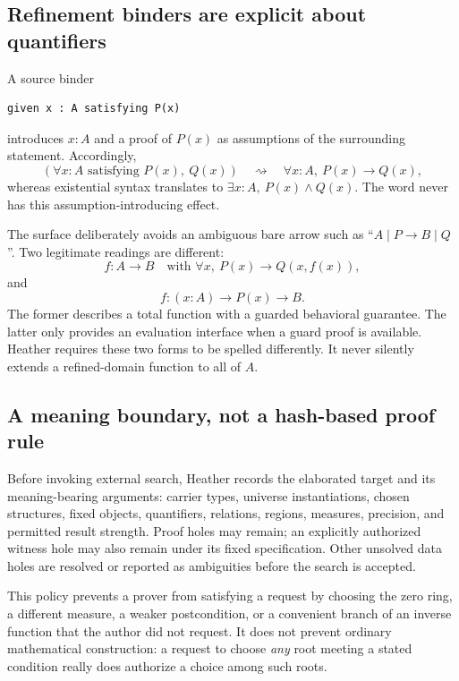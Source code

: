 \documentclass[11pt,letterpaper]{article}
\newcommand{\code}[1]{\texttt{\detokenize{#1}}}
\theoremstyle{definition}\newtheorem{definition}[theorem]{Definition}
\theoremstyle{remark}\newtheorem{remark}[theorem]{Remark}
\begin{document}
\subsection{Refinement binders are explicit about quantifiers}
A source binder
\par\noindent\begin{minipage}{\linewidth}
\begin{lstlisting}
given x : A satisfying P(x)
\end{lstlisting}
\end{minipage}\par
introduces $x:A$ and a proof of $P(x)$ as assumptions of the surrounding
statement. Accordingly,
\[
 (\forall x:A\text{ satisfying }P(x),\ Q(x))
 \quad\rightsquigarrow\quad \forall x:A,\ P(x)\to Q(x),
\]
whereas existential syntax translates to
$\exists x:A,\ P(x)\wedge Q(x)$. The word \code{establish} never has this
assumption-introducing effect.

The surface deliberately avoids an ambiguous bare arrow such as
``$A\mid P\to B\mid Q$''. Two legitimate readings are different:
\[
 f:A\to B\quad\text{with }\forall x,\ P(x)\to Q(x,f(x)),
\]
and
\[
 f:(x:A)\to P(x)\to B.
\]
The former describes a total function with a guarded behavioral guarantee.
The latter only provides an evaluation interface when a guard proof is
available. Heather requires these two forms to be spelled differently.
It never silently extends a refined-domain function to all of $A$.

\subsection{A meaning boundary, not a hash-based proof rule}\label{sec:meaning}
Before invoking external search, Heather records the elaborated target and its
meaning-bearing arguments: carrier types, universe instantiations, chosen
structures, fixed objects, quantifiers, relations, regions, measures, precision,
and permitted result strength. Proof holes may remain; an explicitly authorized
witness hole may also remain under its fixed specification. Other unsolved data
holes are resolved or reported as ambiguities before the search is accepted.

This policy prevents a prover from satisfying a request by choosing the zero
ring, a different measure, a weaker postcondition, or a convenient branch of
an inverse function that the author did not request. It does not prevent
ordinary mathematical construction: a request to choose \emph{any} root meeting
a stated condition really does authorize a choice among such roots.
\end{document}
